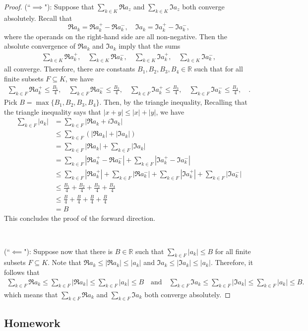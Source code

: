\documentclass[12pt]{article}
\newenvironment{sol}[1][Solution]{\begin{trivlist}
		\item[\hskip \labelsep {\bfseries #1:}]}{\end{trivlist}}
\begin{document}
\begin{sol}
	\begin{proof}
		(``$\implies$"): Suppose that $\sum_{k\in K}\Re a_z$ and $\sum_{k\in K} \Im a_z$
		both converge absolutely. Recall that
		\[
		\Re a_k=\Re a_k^+-\Re a_k^-,\quad \Im a_k=\Im a_k^+-\Im a_k^-,
		\]
		where the operands on the right-hand side are all non-negative.
		Then the absolute convergence of $\Re a_k$ and $\Im a_k$ imply that the
		sums
		\begin{align*}
			\sum_{k\in K}\Re a_k^+,\quad 
			\sum_{k\in K}\Re a_k^-,\quad 
			\sum_{k\in K}\Im a_k^+,\quad 
			\sum_{k\in K}\Im a_k^-,
		\end{align*}
		all converge.  Therefore, there are constants $B_1,B_2,B_3,B_4\in \mathbb{R}$ such that
		for all finite subsets $F\subseteq K$, we have
		\begin{align*}
			\sum_{k\in F}\Re a_k^+\leq \frac{B_1}{4},\quad 
			\sum_{k\in F}\Re a_k^-\leq \frac{B_2}{4},\quad 
			\sum_{k\in F}\Im a_k^+\leq \frac{B_3}{4},\quad 
			\sum_{k\in F}\Im a_k^-\leq \frac{B_4}{4},\quad.
		\end{align*}
		Pick $B=\max\{B_1,B_2,B_3,B_4\}$. Then, by the triangle inequality,
		Recalling that the triangle inequality says that $|x+y|\leq |x|+|y|$, we have
		\begin{align*}
			\sum_{k\in F}|a_k|&=\sum_{k\in F}|\Re a_k+i\Im a_k|\\
			&\leq \sum_{k\in F}(|\Re a_k| + |\Im a_k|)\\
			&=\sum_{k\in F}|\Re a_k| + \sum_{k\in F}|\Im a_k|\\
			&=\sum_{k\in F}|\Re a_k^+ - \Re a_k^-| + \sum_{k\in F}|\Im a_k^+ - \Im a_k^-|\\
			&\leq \sum_{k\in F}|\Re a_k^+|+\sum_{k\in F} |\Re a_k^-|
			+ \sum_{k\in F}|\Im a_k^+| + \sum_{k\in F} |\Im a_k^-|\\
			&\leq \frac{B_1}{4}+\frac{B_2}{4}+\frac{B_3}{4}+\frac{B_4}{4}\\
			&\leq \frac{B}{4}+\frac{B}{4}+\frac{B}{4}+\frac{B}{4}\\
			&= B
		\end{align*}
		This concludes the proof of the forward direction.
		
		\
		
		\noindent (``$\impliedby$"):  Suppose now that there is $B\in\mathbb{R}$
		such that $\sum_{k\in F}|a_k|\leq B$ for all finite subsets $F\subseteq K$.
		Note that $\Re a_k\leq |\Re a_k|\leq |a_k|$ and $\Im a_k\leq |\Im a_k|\leq |a_k|$.
		Therefore, it follows that
		\begin{align*}
			\sum_{k\in F}\Re a_k\leq \sum_{k\in F}|\Re a_k|\leq \sum_{k\in F}|a_k|\leq B
			\quad\text{and}\quad
			\sum_{k\in F}\Im a_k\leq \sum_{k\in F}|\Im a_k|\leq \sum_{k\in F}|a_k|\leq B.
		\end{align*}
		which means that $\sum_{k\in F}\Re a_k$ and $\sum_{k\in F}\Im a_k$ both
		converge absolutely.
	\end{proof}
\end{sol}
\subsection*{Homework}
\end{document}
